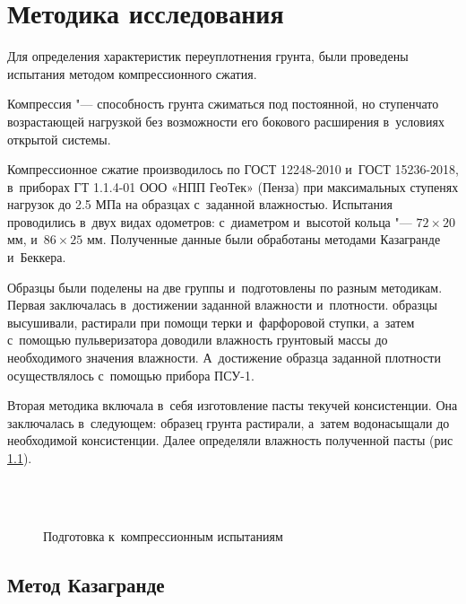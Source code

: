\chapter{Методика исследования}

Для определения характеристик переуплотнения грунта, были проведены испытания методом компрессионного сжатия. 

Компрессия "--- способность грунта сжиматься под постоянной, но ступенчато возрастающей нагрузкой без возможности его бокового расширения в~условиях открытой системы.

Компрессионное сжатие производилось по ГОСТ 12248-2010 и~ГОСТ 15236-2018, в~приборах ГТ 1.1.4-01 ООО «НПП ГеоТек» (Пенза) при максимальных ступенях нагрузок до 2.5 МПа на образцах с~заданной влажностью. Испытания проводились в~двух видах одометров: с~диаметром и~высотой кольца "--- $72 \times 20$ мм, и~$86 \times 25$ мм.
Полученные данные были обработаны методами Казагранде и~Беккера. 

 Образцы были поделены на две группы и~подготовлены по разным методикам.
 Первая заключалась в~достижении заданной влажности и~плотности. образцы высушивали, растирали при помощи терки и~фарфоровой ступки, а~затем с~помощью пульверизатора доводили влажность грунтовый массы до необходимого значения влажности. А~достижение образца заданной плотности осуществлялось с~помощью прибора ПСУ-1.

Вторая методика включала в~себя изготовление пасты текучей консистенции. Она заключалась в~следующем: образец грунта растирали, а~затем водонасыщали до необходимой консистенции. Далее определяли влажность полученной пасты (рис \ref{eq:pst}).


\begin{figure}[ht]
    {\centering
         \hfill
        \\
        \\
    }
    \caption{Подготовка к~компрессионным испытаниям}
    \label{eq:pst}
  \end{figure}

\section{Метод Казагранде}

